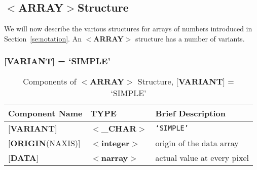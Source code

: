 \documentclass[twoside,11pt]{article}
\newcommand{\htmlref}[2]{#1}
\newcommand{\html}[1]{}
\newcommand{\latex}[1]{#1}
\newcommand{\xlabel}[1]{}
\begin{document}
\subsection{\xlabel{se_array}$<${\bf ARRAY}$>$Structure\label{se:sarray}}

We will now describe the various structures for arrays of numbers 
introduced in \latex{Section~\ref{se:notation}.}\html{\htmlref{Notation 
and Pseudo-types.}{se:notation}}
An \mbox{$<${\bf ARRAY}$>$} structure has a number of variants.

\subsubsection{{[}{\bf VARIANT}{]} = `SIMPLE'}

\begin{table}[htb]
\centering
\caption{Components of $<${\bf ARRAY}$>$ Structure,
               {[}{\bf VARIANT}{]} = `SIMPLE'}
\begin{tabular}{|l|l|l|}
\hline
Component Name  & TYPE & Brief Description \\ \hline
{[}{\bf VARIANT}{]} & $<${\bf \_CHAR}$>$ & {\tt `SIMPLE'} \\
{[}{\bf ORIGIN}(NAXIS){]} & $<${\bf integer}$>$ & origin of the data array \\
{[}{\bf DATA}{]} & $<${\bf narray}$>$ & actual value at every pixel \\ \hline
\end{tabular}
\end{table}
\end{document}
